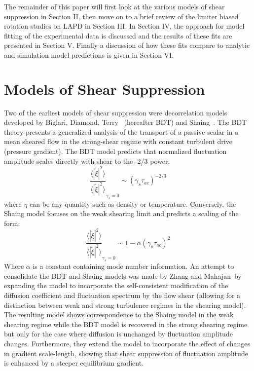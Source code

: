 \documentclass[aip,pop,amsmath,amssymb,preprint,superscriptaddress]{revtex4-1} %
\begin{document}
The remainder of this paper will first look at the various models of shear suppression in Section II, then move on to a brief review of the limiter biased rotation studies on LAPD in Section III. In Section IV, the approach for model fitting of the experimental data is discussed and the results of these fits are presented in Section V. Finally a discussion of how these fits compare to analytic and simulation model predictions is given in Section VI.

\section{Models of Shear Suppression}

Two of the earliest models of shear suppression were decorrelation models developed by Biglari, Diamond, Terry~\cite{biglari90} (hereafter BDT) and Shaing~\cite{shaing90}. The BDT theory presents a generalized analysis of the transport of a passive scalar in a mean sheared flow in the strong-shear regime with constant turbulent drive (pressure gradient). The BDT model predicts that normalized fluctuation amplitude scales directly with shear to the -2/3 power:
%
\begin{equation}
\frac{\langle |\tilde{\xi}|^{2} \rangle}{\langle |\tilde{\xi}|^{2} \rangle}_{\gamma_{s}=0} \sim (\gamma_{s}\tau_{ac})^{-2/3}
\label{eq:BDT_theory}
\end{equation}
%
where $\eta$ can be any quantity such as density or temperature. Conversely, the Shaing model focuses on the weak shearing limit and predicts a scaling of the form:
%
\begin{equation}
\frac{\langle |\tilde{\xi}|^{2} \rangle}{\langle |\tilde{\xi}|^{2} \rangle}_{\gamma_{s}=0} \sim 1- \alpha(\gamma_{s}\tau_{ac})^2
\label{eq:shaing_theory}
\end{equation}
%
Where $\alpha$ is a constant containing mode number information. An attempt to consolidate the BDT and Shaing models was made by Zhang and Mahajan~\cite{zhang92,zhang93}by expanding the model to incorporate the self-consistent modification of the diffusion coefficient and fluctuation spectrum by the flow shear (allowing for a distinction between weak and strong turbulence regimes in the shearing model). The resulting model shows correspondence to the Shaing model in the weak shearing regime while the BDT model is recovered in the strong shearing regime but only for the case where diffusion is unchanged by fluctuation amplitude changes. Furthermore, they extend the model to incorporate the effect of changes in gradient scale-length, showing that shear suppression of fluctuation amplitude is enhanced by a steeper equilibrium gradient. 
\end{document}
